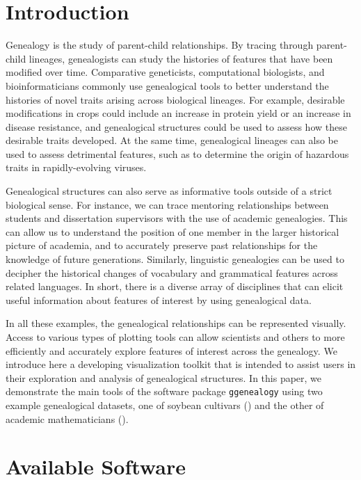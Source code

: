 \documentclass[11pt,a4paper,oldfontcommands,openany]{memoir}
\numberwithin{equation}{section} %
\newcommand{\pkg}[1]{{\texttt{#1}}}
\begin{document}
\section{Introduction}

Genealogy is the study of parent-child relationships. By tracing through parent-child lineages, genealogists can study the histories of features that have been modified over time. Comparative geneticists, computational biologists, and bioinformaticians commonly use genealogical tools to better understand the histories of novel traits arising across biological lineages. For example, desirable modifications in crops could include an increase in protein yield or an increase in disease resistance, and genealogical structures could be used to assess how these desirable traits developed. At the same time, genealogical lineages can also be used to assess detrimental features, such as to determine the origin of hazardous traits in rapidly-evolving viruses.

Genealogical structures can also serve as informative tools outside of a strict biological sense. For instance, we can trace mentoring relationships between students and dissertation supervisors with the use of academic genealogies. This can allow us to understand the position of one member in the larger historical picture of academia, and to accurately preserve past relationships for the knowledge of future generations. Similarly, linguistic genealogies can be used to decipher the historical changes of vocabulary and grammatical features across related languages. In short, there is a diverse array of disciplines that can elicit useful information about features of interest by using genealogical data.

In all these examples, the genealogical relationships can be represented visually. Access to various types of plotting tools can allow scientists and others to more efficiently and accurately explore features of interest across the genealogy. We introduce here a developing visualization toolkit that is intended to assist users in their exploration and analysis of genealogical structures. In this paper, we demonstrate the main tools of the software package \pkg{ggenealogy} using two example genealogical datasets, one of soybean cultivars (\citealt{soybean}) and the other of academic mathematicians (\citealt{mgp}).

\section{Available Software}
\end{document}
